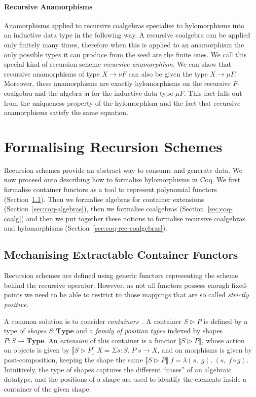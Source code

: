 \documentclass[a4paper,anonymous, UKenglish,cleveref, autoref, thm-restate]{lipics-v2021}
\newcommand{\operator}[1]{\textsf{#1}}
\newcommand{\InIso}{\operator{in}}
\newcommand{\Type}{\mathbf{Type}}
\begin{document}
\paragraph*{Recursive Anamorphisms}
Anamorphisms applied to recursive coalgebras specialise to hylomorphisms into an
inductive data type in the following way. A recursive coalgebra can be applied
only finitely many times, therefore when this is applied to an anamorphism the
only possible types it can produce from the seed are the finite ones. We call
this special kind of recursion scheme \emph{recursive anamorphism}. We can show
that recursive anamorphisms of type $X \to \nu F$ can also be given the type
$X \to \mu F$. Moreover, these anamorphisms are exactly hylomorphisms on the
recursive $F$-coalgebra and the algebra $\InIso$ for the inductive data type
$\mu F$. This fact falls out from the uniqueness property of the hylomorphism
and the fact that recursive anamorphisms satisfy the same equation.

\section{Formalising Recursion Schemes}
\label{sec:recursion-schemes}
Recursion schemes provide an abstract way to consume and generate data. We now
proceed onto describing how to formalise hylomorphisms in Coq. We first
formalise container functors as a tool to represent polynomial functors
(Section~\ref{sec:containers}). Then we formalise algebras for container
extensions (Section~\ref{sec:coq-algebras}), then we formalise coalgebras
(Section~\ref{sec:coq-coalg}) and then we put together these notions to
formalise recursive coalgebras and hylomorphisms
(Section~\ref{sec:coq-rec-coalgebras}).

\subsection{Mechanising Extractable Container Functors}
\label{sec:containers}
Recursion schemes are defined using generic functors representing the scheme
behind the recursive operator.  However, as not all functors possess enough
fixed-points we need to be able to restrict to those mappings 
that are so called \emph{strictly positive}.

A common solution is to consider \emph{containers}~\cite{AbbottAG05}.  A
container $S \triangleright P$ is defined by a type of \emph{shapes} $S : \Type$
and a \emph{family of position types} indexed by shapes $P : S \to \Type$.  An
\emph{extension} of this container is a functor
$\llbracket S \triangleright P \rrbracket$, whose action on objects is given by
$\llbracket S \triangleright P \rrbracket \; X = \Sigma s : S.\; P\;s \to X$,
and on morphisms is given by post-composition, keeping the shape the same
$\llbracket S \triangleright P \rrbracket \; f = \lambda (s,\;g).\;(s,\;f\circ g)$.
Intuitively, the type of shapes captures the different ``cases'' of an algebraic
datatype, and the positions of a shape are used to identify the elements inside
a container of the given shape.
\end{document}
